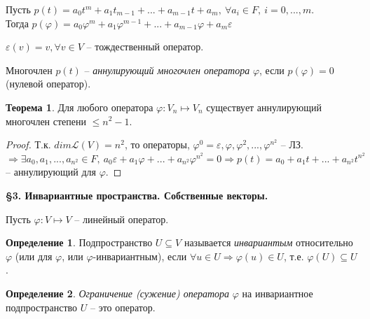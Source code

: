 \documentclass[a4paper, 12pt]{article}
\theoremstyle{definition}
\newtheorem*{definition}{Определение}
\newtheorem*{theorem}{Теорема}
\begin{document}
    Пусть $p(t) = a_0t^m + a_1t_{m-1}+...+a_{m-1}t + a_m,\ 
    \forall a_i \in F,\ i = 0,...,m$.\\ Тогда $p(\varphi) = 
    a_0\varphi^m + a_1\varphi^{m-1}+...+a_{m-1}\varphi + a_m \varepsilon$
    
    $\varepsilon(v) = v, \forall v \in V$ -- тождественный оператор.
    
    Многочлен $p(t)$ -- \textit{аннулирующий многочлен оператора} $\varphi$,
    если $p(\varphi) = 0$ (нулевой оператор).
    \begin{theorem}
        Для любого оператора $\varphi: V_n \longmapsto V_n$
        существует аннулирующий многочлен степени $\leq n^2-1$. 
    \end{theorem}
    \begin{proof}
        Т.к. $dim \mathcal{L}(V) = n^2$, то операторы, $\varphi^0 = \varepsilon,
        \varphi, \varphi^2,..., \varphi^{n^2}$ -- ЛЗ. $\Longrightarrow
        \exists a_0, a_1,..., a_{n^2} \in F,\ 
        a_0\varepsilon + a_1\varphi +...+a_{n^2}\varphi^{n^2} = 0
        \Longrightarrow p(t) = a_0 + a_1t +...+ a_{n^2}t^{n^2}$ --
        аннулирующий для $\varphi$.
        
    \end{proof}

    \begin{center}
        \begin{Large}    
            \textbf{\S3. Инвариантные пространства. Собственные
            векторы.}
        \end{Large}
    \end{center}

    Пусть $\varphi: V \longmapsto V$ -- линейный оператор.
    
    \begin{definition}
        Подпространство $U \subseteq V$ называется \textit{
        инвариантым} относительно $\varphi$ (или для $\varphi$,
        или $\varphi$-инвариантным), если $\forall u \in U
        \Longrightarrow \varphi(u) \in U$, т.е. $\varphi(U)
        \subseteq U$. 
    \end{definition}

    \begin{definition}
        \textit{Ограничение (сужение) оператора} $\varphi$
        на инвариантное подпространство $U$ -- это оператор. 
    \end{definition}
\end{document}
